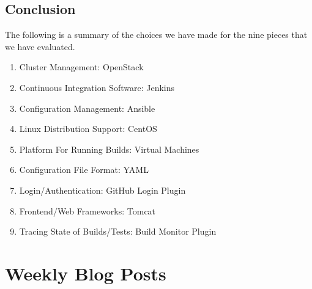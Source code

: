 \documentclass[10pt,letterpaper,onecolumn,draftclsnofoot]{IEEEtran}
\begin{document}
\subsection{Conclusion}
The following is a summary of the choices we have made for the nine pieces that we have evaluated.\\
\begin{enumerate}
  \item Cluster Management: OpenStack
  \item Continuous Integration Software: Jenkins
  \item Configuration Management: Ansible
  \item Linux Distribution Support: CentOS
  \item Platform For Running Builds: Virtual Machines
  \item Configuration File Format: YAML
  \item Login/Authentication: GitHub Login Plugin
  \item Frontend/Web Frameworks: Tomcat
  \item Tracing State of Builds/Tests: Build Monitor Plugin
\end{enumerate}

\section{Weekly Blog Posts}
\clearpage


\end{document}
